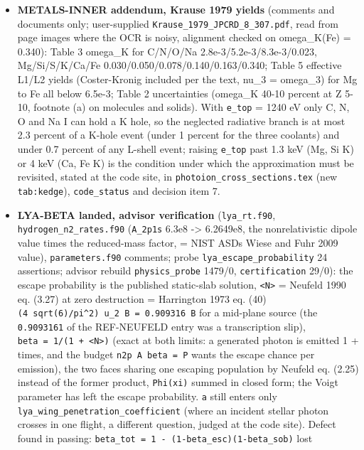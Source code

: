\documentclass[english,a4paper]{my_memo}
\begin{document}
\begin{itemize}
\item
  \textbf{METALS-INNER addendum, Krause 1979 yields} (comments and documents
  only; user-supplied \texttt{Krause\_1979\_JPCRD\_8\_307.pdf}, read from page images
  where the OCR is noisy, alignment checked on omega\_K(Fe) = 0.340): Table 3
  omega\_K for C/N/O/Na 2.8e-3/5.2e-3/8.3e-3/0.023, Mg/Si/S/K/Ca/Fe
  0.030/0.050/0.078/0.140/0.163/0.340; Table 5 effective L1/L2 yields
  (Coster-Kronig included per the text, nu\_3 = omega\_3) for Mg to Fe all
  below 6.5e-3; Table 2 uncertainties (omega\_K 40-10 percent at Z 5-10,
  footnote (a) on molecules and solids). With \texttt{e\_top} = 1240 eV only C, N,
  O and Na I can hold a K hole, so the neglected radiative branch is at most
  2.3 percent of a K-hole event (under 1 percent for the three coolants) and
  under 0.7 percent of any L-shell event; raising \texttt{e\_top} past 1.3 keV (Mg,
  Si K) or 4 keV (Ca, Fe K) is the condition under which the approximation
  must be revisited, stated at the code site, in \texttt{photoion\_cross\_sections.tex}
  (new \texttt{tab:kedge}), \texttt{code\_status} and decision item 7.
\item
  \textbf{LYA-BETA landed, advisor verification} (\texttt{lya\_rt.f90}, \texttt{hydrogen\_n2\_rates.f90}
  (\texttt{A\_2p1s} 6.3e8 -\textgreater{} 6.2649e8, the nonrelativistic dipole value times the
  reduced-mass factor, = NIST ASD\textquotesingle s Wiese and Fuhr 2009 value),
  \texttt{parameters.f90} comments; probe \texttt{lya\_escape\_probability} 24 assertions;
  advisor rebuild \texttt{physics\_probe} 1479/0, \texttt{certification} 29/0): the
  escape probability is the published static-slab solution, \texttt{\textless{}N\textgreater{}} =
  Neufeld 1990 eq. (3.27) at zero destruction = Harrington 1973 eq. (40)
  \texttt{(4\ sqrt(6)/pi\^{}2)\ u\_2\ B\ =\ 0.909316\ B} for a mid-plane source (the
  \texttt{0.9093161} of the REF-NEUFELD entry was a transcription slip), \texttt{beta\ =\ 1/(1\ +\ \textless{}N\textgreater{})} (exact at both limits: a generated photon is emitted 1 +
  times, and the budget \texttt{n2p\ A\ beta\ =\ P} wants the escape chance per
  emission), the two faces sharing one escaping population by Neufeld eq.
  (2.25) instead of the former product, \texttt{Phi(xi)} summed in closed form; the
  Voigt parameter has left the escape probability. \texttt{a} still enters only
  \texttt{lya\_wing\_penetration\_coefficient} (where an incident stellar photon
  crosses in one flight, a different question, judged at the code site).
  Defect found in passing: \texttt{beta\_tot\ =\ 1\ -\ (1-beta\_esc)(1-beta\_sob)} lost

\end{itemize}
\end{document}
